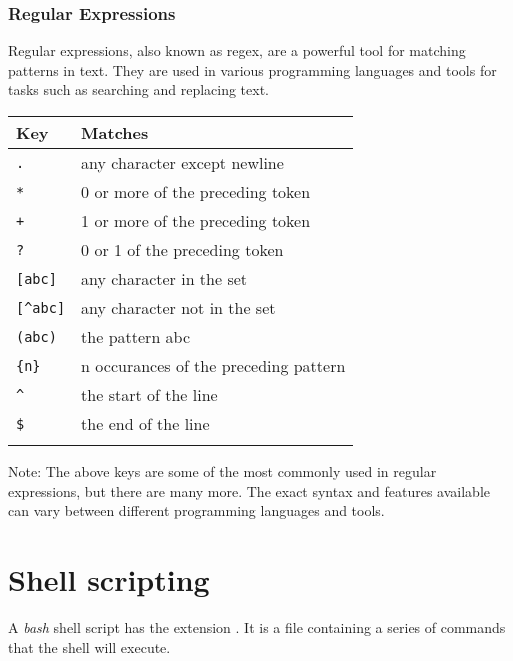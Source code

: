 \documentclass{article}
\begin{document}
\subsubsection{Regular Expressions}

Regular expressions, also known as regex, are a powerful tool for matching patterns in text. They are used in various programming languages and tools for tasks such as searching and replacing text.

\begin{table}[H]
    \begin{tabular}{ll}
        \textbf{Key}       & \textbf{Matches}                      \\ \hline
        \lstinline|.|      & any character except newline          \\ \hline
        \lstinline|*|      & 0 or more of the preceding token      \\ \hline
        \lstinline|+|      & 1 or more of the preceding token      \\ \hline
        \lstinline|?|      & 0 or 1 of the preceding token         \\ \hline
        \lstinline|[abc]|  & any character in the set              \\ \hline
        \lstinline|[^abc]| & any character not in the set          \\ \hline
        \lstinline|(abc)|  & the pattern abc                       \\ \hline
        \lstinline|{n}|    & n occurances of the preceding pattern \\ \hline
        \lstinline|^|      & the start of the line                 \\ \hline
        \lstinline|$|      & the end of the line                   \\ \hline
    \end{tabular}
\end{table}

Note: The above keys are some of the most commonly used in regular expressions, but there are many more. The exact syntax and features available can vary between different programming languages and tools.
\newpage

\section{Shell scripting}
A \emph{bash} shell script has the extension . It is a file containing a series of commands that the shell will execute.
\end{document}
